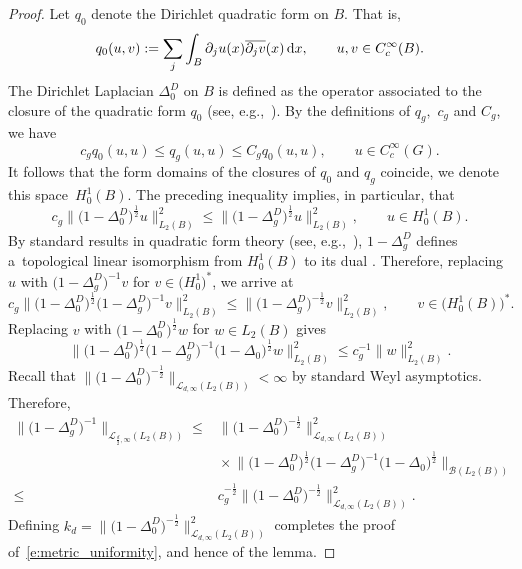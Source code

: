 \documentclass[pdftex]{sigma}
\numberwithin{equation}{section}
\begin{document}
\begin{proof}
Let $q_0$ denote the Dirichlet quadratic form on $B.$ That is,
\[
 q_0(u,v) := \sum_{j} \int_B \partial_j u(x)\overline{\partial_j v}(x)\,{\rm d}x,\qquad u,v \in C^\infty_c(B).
\]
The Dirichlet Laplacian $\Delta_0^D$ on $B$ is defined as the operator associated to the closure of the quadratic form $q_0$ (see, e.g.,~\cite[Example~7.5.26]{Simon-course-IV}).
By the definitions of $q_g,$ $c_g$ and $C_g$, we have
\[
 c_gq_0(u,u) \leq q_g(u,u) \leq C_gq_0(u,u),\qquad u\in C^\infty_c(G).
\]
It follows that the form domains of the closures of $q_0$ and $q_g$ coincide, we denote this space~$H^1_0(B).$
The preceding inequality implies, in particular, that
\[
 c_g\big\|\big(1-\Delta_0^D\big)^{\frac12}u\big\|_{L_2(B)}^2 \leq \big\|\big(1-\Delta_g^D\big)^{\frac12}u\big\|_{L_2(B)}^2,\qquad u\in H^1_0(B).
\]
By standard results in quadratic form theory (see, e.g.,~\cite[equation (7.5.29)]{Simon-course-IV}), $1-\Delta_g^D$ defines a~topological linear isomorphism from $H^1_0(B)$ to its dual . Therefore, replacing $u$ with $\big(1-\Delta_g^D\big)^{-1}v$ for $v\in \big(H^1_0\big)^*$, we arrive at
\[
 c_g\big\|\big(1-\Delta_0^D\big)^{\frac12}\big(1-\Delta_g^D\big)^{-1}v\big\|_{L_2(B)}^2 \leq \big\|\big(1-\Delta_g^D\big)^{-\frac12}v\big\|_{L_2(B)}^2,\qquad v \in \big(H^1_0(B)\big)^*.
\]
Replacing $v$ with $\big(1-\Delta_0^D\big)^{\frac12}w$ for $w \in L_2(B)$ gives
\[
 \big\|\big(1-\Delta_0^D\big)^{\frac12}\big(1-\Delta_g^D\big)^{-1}\big(1-\Delta_0\big)^{\frac12}w\big\|_{L_2(B)}^2 \leq c_g^{-1}\|w\|_{L_2(B)}^2.
\]
Recall that $\big\|\big(1-\Delta_0^D\big)^{-\frac12}\big\|_{\mathcal{L}_{d,\infty}(L_2(B)) }<\infty$ by standard Weyl asymptotics. Therefore,
\begin{align*}
 \big\|\big(1-\Delta_g^D\big)^{-1}\big\|_{\mathcal{L}_{\frac{d}{2},\infty}(L_2(B))}\leq{}& \big\|\big(1-\Delta_0^D\big)^{-\frac12}\big\|_{\mathcal{L}_{d,\infty}(L_2(B)) }^2 \\
 &{}\times \big\|\big(1-\Delta_0^D\big)^{\frac12}\big(1-\Delta_g^D\big)^{-1}\big(1-\Delta_0\big)^{\frac12}\big\|_{\mathcal{B}(L_2(B))}\\
\leq{}& c_g^{-\frac12}\big\|\big(1-\Delta_0^D\big)^{-\frac12}\big\|_{\mathcal{L}_{d,\infty}(L_2(B)) }^2.
\end{align*}
Defining $k_d = \bigl\|\bigl(1-\Delta_0^D\bigr)^{-\frac12}\bigr\|_{\mathcal{L}_{d,\infty}(L_2(B)) }^2$
completes the proof of~\eqref{e:metric_uniformity},
and hence of the lemma.
\end{proof}
\end{document}
